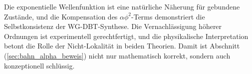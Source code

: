 Die exponentielle Wellenfunktion ist eine natürliche Näherung für gebundene Zustände, und die Kompensation des $\alpha \phi^{2}$-Terms demonstriert die Selbstkonsistenz der WG-DBT-Synthese.
Die Vernachlässigung höherer Ordnungen ist experimentell gerechtfertigt, und die physikalische Interpretation betont die Rolle der Nicht-Lokalität in beiden Theorien. Damit ist
Abschnitt (\ref{sec:bahn_alpha_beweis}) nicht nur mathematisch korrekt, sondern auch konzeptionell schlüssig.
